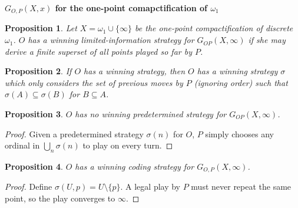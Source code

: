 \documentclass[11pt]{article}
\theoremstyle{plain}
\newtheorem{theorem}{Theorem}
\newtheorem{proposition}[theorem]{Proposition}
\theoremstyle{definition}
\theoremstyle{remark}
\begin{document}
\centerline{\bf $G_{O,P}(X,x)$ for the one-point comapctification of $\omega_1$}

\begin{proposition}
Let $X=\omega_1\cup\{\infty\}$ be the one-point compactification of discrete $\omega_1$. $O$ has a winning limited-information strategy for $G_{OP}(X,\infty)$ if she may derive a finite superset of all points played so far by $P$.
\end{proposition}

\begin{proposition}
If $O$ has a winning strategy, then $O$ has a winning strategy $\sigma$ which only considers the set of previous moves by $P$ (ignoring order) such that $\sigma(A)\subseteq \sigma(B)$ for $B\subseteq A$.
\end{proposition}

\begin{proposition}
$O$ has no winning predetermined strategy for $G_{OP}(X,\infty)$.
\end{proposition}

\begin{proof}
Given a predetermined strategy $\sigma(n)$ for $O$, $P$ simply chooses any ordinal in $\bigcup_n \sigma(n)$ to play on every turn.
\end{proof}

\begin{proposition}
$O$ has a winning coding strategy for $G_{O,P}(X,\infty)$. 
\end{proposition}

\begin{proof}
Define $\sigma(U,p)=U\setminus\{p\}$. A legal play by $P$ must never repeat the same point, so the play converges to $\infty$.
\end{proof}



\end{document}
